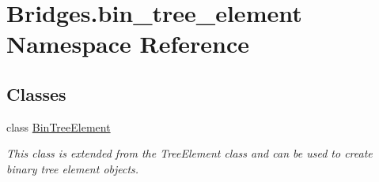 \hypertarget{namespace_bridges_1_1bin__tree__element}{}\section{Bridges.\+bin\+\_\+tree\+\_\+element Namespace Reference}
\label{namespace_bridges_1_1bin__tree__element}
\subsection*{Classes}
\begin{DoxyCompactItemize}
\item 
class \hyperlink{class_bridges_1_1bin__tree__element_1_1_bin_tree_element}{Bin\+Tree\+Element}
\begin{DoxyCompactList}\small\item\em This class is extended from the Tree\+Element class and can be used to create binary tree element objects. \end{DoxyCompactList}\end{DoxyCompactItemize}
